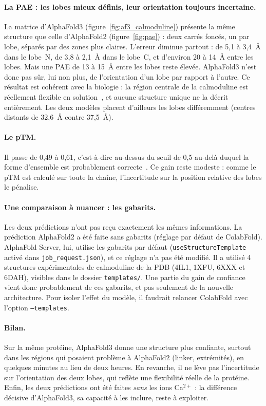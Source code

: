 \paragraph{La PAE : les lobes mieux définis, leur orientation toujours incertaine.} La matrice d'AlphaFold3 (figure~\ref{fig:af3_calmoduline}) présente la même structure que celle d'AlphaFold2 (figure~\ref{fig:pae}) : deux carrés foncés, un par lobe, séparés par des zones plus claires. L'erreur diminue partout : de 5,1 à 3,4~Å dans le lobe~N, de 3,8 à 2,1~Å dans le lobe~C, et d'environ 20 à 14~Å entre les lobes. Mais une PAE de 13 à 15~Å entre les lobes reste élevée. AlphaFold3 n'est donc pas sûr, lui non plus, de l'orientation d'un lobe par rapport à l'autre. Ce résultat est cohérent avec la biologie : la région centrale de la calmoduline est réellement flexible en solution~\cite{barbato1992}, et aucune structure unique ne la décrit entièrement. Les deux modèles placent d'ailleurs les lobes différemment (centres distants de 32,6~Å contre 37,5~Å).

\paragraph{Le pTM.} Il passe de 0,49 à 0,61, c'est-à-dire au-dessus du seuil de 0,5 au-delà duquel la forme d'ensemble est probablement correcte~\cite{zhang2004}. Ce gain reste modeste : comme le pTM est calculé sur toute la chaîne, l'incertitude sur la position relative des lobes le pénalise.

\paragraph{Une comparaison à nuancer : les gabarits.} Les deux prédictions n'ont pas reçu exactement les mêmes informations. La prédiction AlphaFold2 a été faite sans gabarits (réglage par défaut de ColabFold). AlphaFold Server, lui, utilise les gabarits par défaut (\texttt{useStructureTemplate} activé dans \texttt{job\_request.json}), et ce réglage n'a pas été modifié. Il a utilisé 4 structures expérimentales de calmoduline de la PDB (4IL1, 1XFU, 6XXX et 6DAH), visibles dans le dossier \texttt{templates/}. Une partie du gain de confiance vient donc probablement de ces gabarits, et pas seulement de la nouvelle architecture. Pour isoler l'effet du modèle, il faudrait relancer ColabFold avec l'option \texttt{--templates}.

\paragraph{Bilan.} Sur la même protéine, AlphaFold3 donne une structure plus confiante, surtout dans les régions qui posaient problème à AlphaFold2 (linker, extrémités), en quelques minutes au lieu de deux heures. En revanche, il ne lève pas l'incertitude sur l'orientation des deux lobes, qui reflète une flexibilité réelle de la protéine. Enfin, les deux prédictions ont été faites \emph{sans} les ions Ca$^{2+}$ : la différence décisive d'AlphaFold3, sa capacité à les inclure, reste à exploiter.


